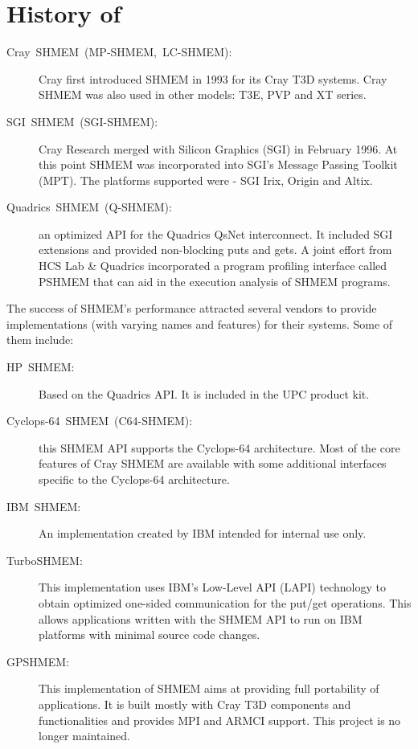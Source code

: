 \section*{History of \openshmem{}}
\begin{description}
\item [{{Cray~SHMEM~(MP-SHMEM,~LC-SHMEM):}}] Cray first introduced
SHMEM in 1993 for its Cray T3D systems. Cray SHMEM was also used in
other models: T3E, PVP and XT series. 
\item [{{SGI~SHMEM~(SGI-SHMEM):}}] Cray Research merged with Silicon
Graphics (SGI) in February 1996. At this point SHMEM was incorporated
into SGI's Message Passing Toolkit (MPT). The platforms supported
were - SGI Irix, Origin and Altix. 
\item [{{Quadrics~SHMEM~(Q-SHMEM):}}] an optimized API for the Quadrics
QsNet interconnect. It included SGI extensions and provided non-blocking
puts and gets. A joint effort from HCS Lab \& Quadrics incorporated
a program profiling interface called PSHMEM that can aid in the execution
analysis of SHMEM programs. 
\end{description}
The success of SHMEM's performance attracted several vendors to provide
implementations (with varying names and features) for their systems.
Some of them include: 
\begin{description}
\item [{{HP~SHMEM:}}] Based on the Quadrics API. It is included in the
UPC product kit. 
\item [{{Cyclops-64~SHMEM~(C64-SHMEM):}}] this SHMEM API supports the
Cyclops-64 architecture. Most of the core features of Cray SHMEM are
available with some additional interfaces specific to the Cyclops-64
architecture. 

\item [{{IBM~SHMEM:}}] An implementation created by IBM intended for
internal use only. 
\item [{{TurboSHMEM:}}] This implementation uses IBM's Low-Level API
(LAPI) technology to obtain optimized one-sided communication for
the put/get operations. This allows applications written with the
SHMEM API to run on IBM platforms with minimal source code changes. 
\item [{{GPSHMEM:}}] This implementation of SHMEM aims at providing full
portability of applications. It is built mostly with Cray T3D components
and functionalities and provides MPI and ARMCI support. This project
is no longer maintained. 
\end{description}

